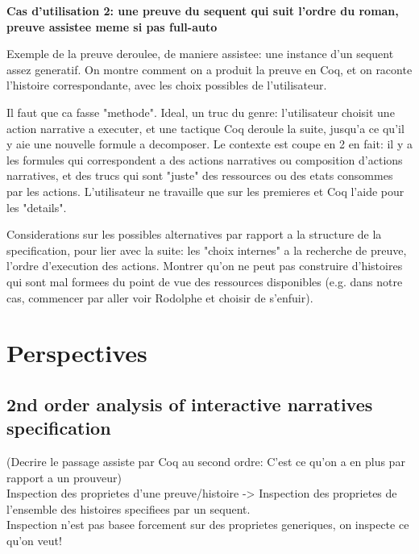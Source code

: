 \documentclass[runningheads,a4paper]{llncs}
\begin{document}
\textbf{Cas d'utilisation 2: une preuve du sequent qui suit l'ordre du roman, preuve assistee meme si pas full-auto}

Exemple de la preuve deroulee, de maniere assistee: une instance d'un sequent assez generatif. On montre comment on a produit la preuve en Coq, et on raconte l'histoire correspondante, avec les choix possibles de l'utilisateur. 

Il faut que ca fasse "methode". Ideal, un truc du genre: l'utilisateur choisit une action narrative a executer, et une tactique Coq deroule la suite, jusqu'a ce qu'il y aie une nouvelle formule a decomposer. Le contexte est coupe en 2 en fait: il y a les formules qui correspondent a des actions narratives ou composition d'actions narratives, et des trucs qui sont "juste" des ressources ou des etats consommes par les actions. L'utilisateur ne travaille que sur les premieres et Coq l'aide pour les "details".

Considerations sur les possibles alternatives par rapport a la structure de la specification, pour lier avec la suite: les "choix internes" a la recherche de preuve, l'ordre d'execution des actions. Montrer qu'on ne peut pas construire d'histoires qui sont mal formees du point de vue des ressources disponibles (e.g. dans notre cas, commencer par aller voir Rodolphe et choisir de s'enfuir).
\section{Perspectives}
\subsection{2nd order analysis of interactive narratives specification}
(Decrire le passage assiste par Coq au second ordre: C'est ce qu'on a en plus par rapport a un prouveur)
\\
Inspection des proprietes d'une preuve/histoire -> Inspection des proprietes de l'ensemble des histoires specifiees par un sequent.\\
Inspection n'est pas basee forcement sur des proprietes generiques, on inspecte ce qu'on veut!
\end{document}
